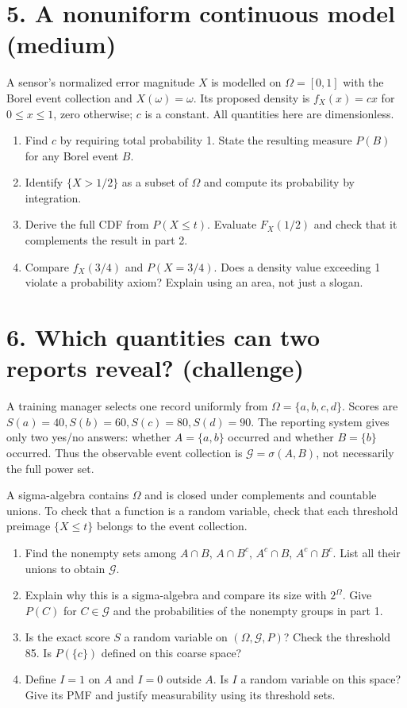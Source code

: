 \documentclass[11pt,a4paper]{article}
\begin{document}
\section*{5. A nonuniform continuous model (medium)}
A sensor's normalized error magnitude $X$ is modelled on $\Omega=[0,1]$ with the Borel event collection and $X(\omega)=\omega$. Its proposed density is $f_X(x)=cx$ for $0\le x\le1$, zero otherwise; $c$ is a constant. All quantities here are dimensionless.
\begin{enumerate}
\item Find $c$ by requiring total probability 1. State the resulting measure $P(B)$ for any Borel event $B$.
\item Identify $\{X>1/2\}$ as a subset of $\Omega$ and compute its probability by integration.
\item Derive the full CDF from $P(X\le t)$. Evaluate $F_X(1/2)$ and check that it complements the result in part 2.
\item Compare $f_X(3/4)$ and $P(X=3/4)$. Does a density value exceeding 1 violate a probability axiom? Explain using an area, not just a slogan.
\end{enumerate}

\section*{6. Which quantities can two reports reveal? (challenge)}
A training manager selects one record uniformly from $\Omega=\{a,b,c,d\}$. Scores are $S(a)=40,S(b)=60,S(c)=80,S(d)=90$. The reporting system gives only two yes/no answers: whether $A=\{a,b\}$ occurred and whether $B=\{b\}$ occurred. Thus the observable event collection is $\mathcal G=\sigma(A,B)$, not necessarily the full power set.

A sigma-algebra contains $\Omega$ and is closed under complements and countable unions. To check that a function is a random variable, check that each threshold preimage $\{X\le t\}$ belongs to the event collection.
\begin{enumerate}
\item Find the nonempty sets among $A\cap B$, $A\cap B^c$, $A^c\cap B$, $A^c\cap B^c$. List all their unions to obtain $\mathcal G$.
\item Explain why this is a sigma-algebra and compare its size with $2^\Omega$. Give $P(C)$ for $C\in\mathcal G$ and the probabilities of the nonempty groups in part 1.
\item Is the exact score $S$ a random variable on $(\Omega,\mathcal G,P)$? Check the threshold 85. Is $P(\{c\})$ defined on this coarse space?
\item Define $I=1$ on $A$ and $I=0$ outside $A$. Is $I$ a random variable on this space? Give its PMF and justify measurability using its threshold sets.
\end{enumerate}
\end{document}

